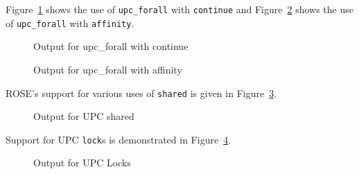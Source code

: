 Figure~\ref{Manual:UPC:forall1} shows the use of \lstinline{upc_forall}
with \lstinline{continue} and Figure~\ref{Manual:UPC:forall2} shows the use
of \lstinline{upc_forall} with \lstinline{affinity}.

\begin{figure}[!h]
{\indent
  {\mySmallFontSize
    \begin{latexonly}
    
    \end{latexonly}
    \begin{htmlonly}
    
    \end{htmlonly}
  }
}
\caption{Output for upc\_forall with continue}
\label{Manual:UPC:forall1}
\end{figure}

\begin{figure}[!h]
{\indent
  {\mySmallFontSize
    \begin{latexonly}
    
    \end{latexonly}
    \begin{htmlonly}
    
    \end{htmlonly}
  }
}
\caption{Output for upc\_forall with affinity }
\label{Manual:UPC:forall2}
\end{figure}

ROSE's support for various uses of \lstinline{shared} is given in
Figure~\ref{Manual:UPC:shared}. 
\begin{figure}[!h]
{\indent
  {\mySmallFontSize
    \begin{latexonly}
    
    \end{latexonly}
    \begin{htmlonly}
    
    \end{htmlonly}
  }
}
\caption{Output for UPC shared}
\label{Manual:UPC:shared}
\end{figure}

Support for UPC \lstinline{lock}s is demonstrated in
Figure~\ref{Manual:UPC:lock}. 
\begin{figure}[!h]
{\indent
  {\mySmallFontSize
    \begin{latexonly}
    
    \end{latexonly}
    \begin{htmlonly}
    
    \end{htmlonly}
  }
}
\caption{Output for UPC Locks}
\label{Manual:UPC:lock}
\end{figure}

